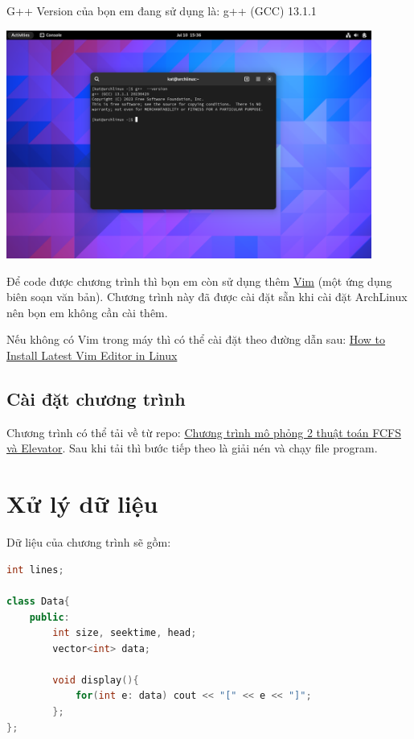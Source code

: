 \documentclass{report}
\begin{document}
        G++ Version của bọn em đang sử dụng là: g++ (GCC) 13.1.1

        \includegraphics[width = 12cm]{images/g++version.png}
        
        Để code được chương trình thì bọn em còn sử dụng thêm \href{https://www.vim.org/}{Vim} (một ứng dụng biên soạn văn bản). Chương trình này đã được cài đặt sẵn khi cài đặt ArchLinux nên bọn em không cần cài thêm.

        Nếu không có Vim trong máy thì có thể cài đặt theo đường dẫn sau: \href{https://tecadmin.net/install-vim-linux/}{How to Install Latest Vim Editor in Linux}

        \subsection{Cài đặt chương trình}
        Chương trình có thể tải về từ repo: \href{https://github.com/kat1002/osg202_presentation.git}{Chương trình mô phỏng 2 thuật toán FCFS và Elevator}.
        Sau khi tải thì bước tiếp theo là giải nén và chạy file program.
            
    \section{Xử lý dữ liệu}
        Dữ liệu của chương trình sẽ gồm:

        \begin{lstlisting}[language=C++, caption=Data in program]
int lines;

class Data{
    public: 
        int size, seektime, head;
        vector<int> data;
        
        void display(){
            for(int e: data) cout << "[" << e << "]"; 
        };
};
        \end{lstlisting}
\end{document}
